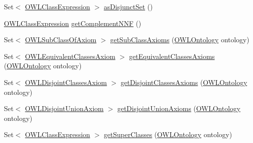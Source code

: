 \begin{DoxyCompactItemize}
\item 
Set$<$ \hyperlink{interfaceorg_1_1semanticweb_1_1owlapi_1_1model_1_1_o_w_l_class_expression}{O\-W\-L\-Class\-Expression} $>$ \hyperlink{classuk_1_1ac_1_1manchester_1_1cs_1_1owl_1_1owlapi_1_1_o_w_l_class_impl_a9fce35eb707446deecf9b3a8e5ca7606}{as\-Disjunct\-Set} ()
\item 
\hyperlink{interfaceorg_1_1semanticweb_1_1owlapi_1_1model_1_1_o_w_l_class_expression}{O\-W\-L\-Class\-Expression} \hyperlink{classuk_1_1ac_1_1manchester_1_1cs_1_1owl_1_1owlapi_1_1_o_w_l_class_impl_a6e4c03bda6e6c1b0f9cdfac104c9e112}{get\-Complement\-N\-N\-F} ()
\item 
Set$<$ \hyperlink{interfaceorg_1_1semanticweb_1_1owlapi_1_1model_1_1_o_w_l_sub_class_of_axiom}{O\-W\-L\-Sub\-Class\-Of\-Axiom} $>$ \hyperlink{classuk_1_1ac_1_1manchester_1_1cs_1_1owl_1_1owlapi_1_1_o_w_l_class_impl_a3d0a9bf7469416c24b8e3c46c95da0a3}{get\-Sub\-Class\-Axioms} (\hyperlink{interfaceorg_1_1semanticweb_1_1owlapi_1_1model_1_1_o_w_l_ontology}{O\-W\-L\-Ontology} ontology)
\item 
Set$<$ \hyperlink{interfaceorg_1_1semanticweb_1_1owlapi_1_1model_1_1_o_w_l_equivalent_classes_axiom}{O\-W\-L\-Equivalent\-Classes\-Axiom} $>$ \hyperlink{classuk_1_1ac_1_1manchester_1_1cs_1_1owl_1_1owlapi_1_1_o_w_l_class_impl_ab377bdf0a81fb72458a2b8c6b80e5cd2}{get\-Equivalent\-Classes\-Axioms} (\hyperlink{interfaceorg_1_1semanticweb_1_1owlapi_1_1model_1_1_o_w_l_ontology}{O\-W\-L\-Ontology} ontology)
\item 
Set$<$ \hyperlink{interfaceorg_1_1semanticweb_1_1owlapi_1_1model_1_1_o_w_l_disjoint_classes_axiom}{O\-W\-L\-Disjoint\-Classes\-Axiom} $>$ \hyperlink{classuk_1_1ac_1_1manchester_1_1cs_1_1owl_1_1owlapi_1_1_o_w_l_class_impl_ae406df989f86187c7be699d9a7e8ae1b}{get\-Disjoint\-Classes\-Axioms} (\hyperlink{interfaceorg_1_1semanticweb_1_1owlapi_1_1model_1_1_o_w_l_ontology}{O\-W\-L\-Ontology} ontology)
\item 
Set$<$ \hyperlink{interfaceorg_1_1semanticweb_1_1owlapi_1_1model_1_1_o_w_l_disjoint_union_axiom}{O\-W\-L\-Disjoint\-Union\-Axiom} $>$ \hyperlink{classuk_1_1ac_1_1manchester_1_1cs_1_1owl_1_1owlapi_1_1_o_w_l_class_impl_a41c11ec03ef4abff629a7613dce83090}{get\-Disjoint\-Union\-Axioms} (\hyperlink{interfaceorg_1_1semanticweb_1_1owlapi_1_1model_1_1_o_w_l_ontology}{O\-W\-L\-Ontology} ontology)
\item 
Set$<$ \hyperlink{interfaceorg_1_1semanticweb_1_1owlapi_1_1model_1_1_o_w_l_class_expression}{O\-W\-L\-Class\-Expression} $>$ \hyperlink{classuk_1_1ac_1_1manchester_1_1cs_1_1owl_1_1owlapi_1_1_o_w_l_class_impl_afd1e570cf8d5f73946bb8ab25d1da53f}{get\-Super\-Classes} (\hyperlink{interfaceorg_1_1semanticweb_1_1owlapi_1_1model_1_1_o_w_l_ontology}{O\-W\-L\-Ontology} ontology)

\end{DoxyCompactItemize}
